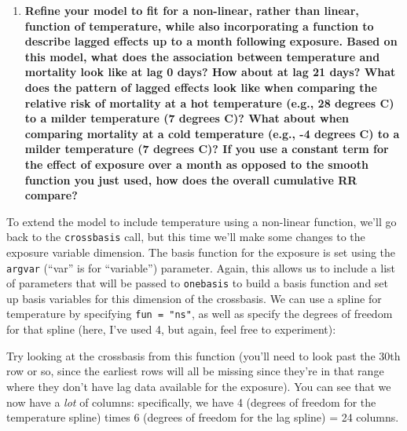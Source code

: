 \documentclass[
]{book}
\newenvironment{Shaded}{\begin{snugshade}}{\end{snugshade}}
\newcommand{\DataTypeTok}[1]{\textcolor[rgb]{0.13,0.29,0.53}{#1}}
\newcommand{\DecValTok}[1]{\textcolor[rgb]{0.00,0.00,0.81}{#1}}
\newcommand{\KeywordTok}[1]{\textcolor[rgb]{0.13,0.29,0.53}{\textbf{#1}}}
\newcommand{\NormalTok}[1]{#1}
\newcommand{\OperatorTok}[1]{\textcolor[rgb]{0.81,0.36,0.00}{\textbf{#1}}}
\newcommand{\StringTok}[1]{\textcolor[rgb]{0.31,0.60,0.02}{#1}}
\providecommand{\tightlist}{%
  \setlength{\itemsep}{0pt}\setlength{\parskip}{0pt}}
\begin{document}
\begin{enumerate}
\def\labelenumi{\arabic{enumi}.}
\setcounter{enumi}{2}
\tightlist
\item
  \textbf{Refine your model to fit for a non-linear, rather than linear, function
  of temperature, while also incorporating a function to describe lagged effects up
  to a month following exposure. Based on this model, what does the association
  between temperature and mortality look like at lag 0 days? How about at lag 21 days?
  What does the pattern of lagged effects look like when comparing the relative risk of
  mortality at a hot temperature (e.g., 28 degrees C) to a milder temperature
  (7 degrees C)? What about when comparing mortality at a cold temperature
  (e.g., -4 degrees C) to a milder temperature (7 degrees C)? If you use a constant
  term for the effect of exposure
  over a month as opposed to the smooth function you just used, how does the overall
  cumulative RR compare?}
\end{enumerate}

To extend the model to include temperature using a non-linear function, we'll go back
to the \texttt{crossbasis} call, but this time we'll make some changes to the exposure variable
dimension. The basis function for the exposure is set using the \texttt{argvar} (``var'' is
for ``variable'') parameter. Again, this allows us to include a list of parameters that
will be passed to \texttt{onebasis} to build a basis function and set up basis variables for
this dimension of the crossbasis. We can use a spline for temperature by specifying
\texttt{fun\ =\ "ns"}, as well as specify the degrees of freedom for that spline (here, I've used
4, but again, feel free to experiment):

\begin{Shaded}
\end{Shaded}

Try looking at the crossbasis from this function (you'll need to look past the 30th row
or so, since the earliest rows will all be missing since they're in that range where
they don't have lag data available for the exposure). You can see that we now have a
\emph{lot} of columns: specifically, we have 4 (degrees of freedom for the temperature spline)
times 6 (degrees of freedom for the lag spline) = 24 columns.
\end{document}
